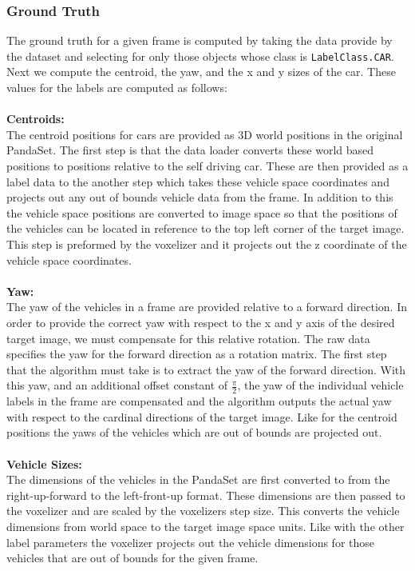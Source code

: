 \documentclass[letter]{article}
\begin{document}
	\subsubsection{Ground Truth}
	The ground truth for a given frame is computed by taking the data provide by the dataset and selecting for only those objects whose class is \verb|LabelClass.CAR|. Next we compute the centroid, the yaw, and the x and y sizes of the car. These values for the labels are computed as follows:\\\\
	\textbf{Centroids:}\\
	The centroid positions for cars are provided as 3D world positions in the original PandaSet. The first step is that the data loader converts these world based positions to positions relative to the self driving car. These are then provided as a label data to the another step which takes these vehicle space coordinates and projects out any out of bounds vehicle data from the frame. In addition to this the vehicle space positions are converted to image space so that the positions of the vehicles can be located in reference to the top left corner of the target image. This step is preformed by the voxelizer and it projects out the z coordinate of the vehicle space coordinates.\\\\
	\textbf{Yaw:}\\
	The yaw of the vehicles in a frame are provided relative to a forward direction. In order to provide the correct yaw with respect to the x and y axis of the desired target image, we must compensate for this relative rotation. The raw data specifies the yaw for the forward direction as a rotation matrix. The first step that the algorithm must take is to extract the yaw of the forward direction. With this yaw, and an additional offset constant of $\frac{\pi}{2}$, the yaw of the individual vehicle labels in the frame are compensated and the algorithm outputs the actual yaw with respect to the cardinal directions of the target image. Like for the centroid positions the yaws of the vehicles which are out of bounds are projected out.\\\\
	\newpage
	\textbf{Vehicle Sizes:}\\
	The dimensions of the vehicles in the PandaSet are first converted to from the right-up-forward to the left-front-up format. These dimensions are then passed to the voxelizer and are scaled by the voxelizers step size. This converts the vehicle dimensions from world space to the target image space units. Like with the other label parameters the voxelizer projects out the vehicle dimensions for those vehicles that are out of bounds for the given frame.\\\\
\end{document}
